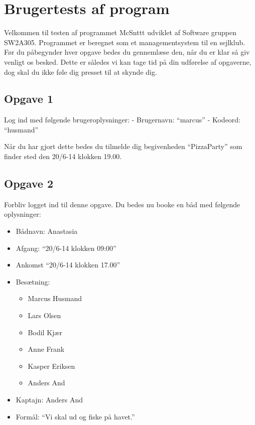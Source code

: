 \chapter{Brugertests af program}\label{BrugerTestCases}


Velkommen til testen af programmet McSnttt udviklet af Software gruppen SW2A305.
Programmet er beregnet som et managementsystem til en sejlklub.
Før du påbegynder hver opgave bedes du gennemlæse den, når du er klar så giv venligt os besked.
Dette er således vi kan tage tid på din udførelse af opgaverne, dog skal du ikke føle dig presset til at skynde dig.

\section{Opgave 1}

Log ind med følgende brugeroplysninger: 
\newline - Brugernavn: ``marcus''
\newline - Kodeord: ``husmand''

Når du har gjort dette bedes du tilmelde dig begivenheden ``PizzaParty'' som finder sted den 20/6-14 klokken 19.00.

\section{Opgave 2}

Forbliv logget ind til denne opgave. Du bedes nu booke en båd med følgende oplysninger:

\begin{itemize}
	\item Bådnavn: Anastasia
	\item Afgang: ``20/6-14 klokken 09:00''
	\item Ankomst ``20/6-14 klokken 17.00''
	\item Besætning: 
	\begin{itemize}
		\item Marcus Husmand
		\item Lars Olsen
		\item Bodil Kjær
		\item Anne Frank
		\item Kasper Eriksen
		\item Anders And
	\end{itemize}
	\item Kaptajn: Anders And
	\item Formål: ``Vi skal ud og fiske på havet.''

\end{itemize}

